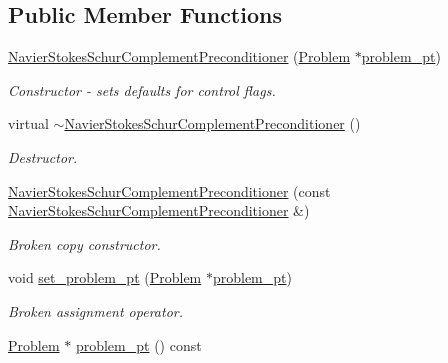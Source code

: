 \subsection*{Public Member Functions}
\begin{DoxyCompactItemize}
\item 
\hyperlink{classoomph_1_1NavierStokesSchurComplementPreconditioner_ac5ca2d9d665f4bd0a9f2e2cc103486b0}{Navier\+Stokes\+Schur\+Complement\+Preconditioner} (\hyperlink{classoomph_1_1Problem}{Problem} $\ast$\hyperlink{classoomph_1_1NavierStokesSchurComplementPreconditioner_afc57fedbcd960d99c5ab3f135eacb612}{problem\+\_\+pt})
\begin{DoxyCompactList}\small\item\em Constructor -\/ sets defaults for control flags. \end{DoxyCompactList}\item 
virtual \hyperlink{classoomph_1_1NavierStokesSchurComplementPreconditioner_ad954b4f67329c643d5219ed573805b81}{$\sim$\+Navier\+Stokes\+Schur\+Complement\+Preconditioner} ()
\begin{DoxyCompactList}\small\item\em Destructor. \end{DoxyCompactList}\item 
\hyperlink{classoomph_1_1NavierStokesSchurComplementPreconditioner_a3597811461decb5beec486bce3de36cd}{Navier\+Stokes\+Schur\+Complement\+Preconditioner} (const \hyperlink{classoomph_1_1NavierStokesSchurComplementPreconditioner}{Navier\+Stokes\+Schur\+Complement\+Preconditioner} \&)
\begin{DoxyCompactList}\small\item\em Broken copy constructor. \end{DoxyCompactList}\item 
void \hyperlink{classoomph_1_1NavierStokesSchurComplementPreconditioner_a41814f592afecb493310be513c595739}{set\+\_\+problem\+\_\+pt} (\hyperlink{classoomph_1_1Problem}{Problem} $\ast$\hyperlink{classoomph_1_1NavierStokesSchurComplementPreconditioner_afc57fedbcd960d99c5ab3f135eacb612}{problem\+\_\+pt})
\begin{DoxyCompactList}\small\item\em Broken assignment operator. \end{DoxyCompactList}\item 
\hyperlink{classoomph_1_1Problem}{Problem} $\ast$ \hyperlink{classoomph_1_1NavierStokesSchurComplementPreconditioner_afc57fedbcd960d99c5ab3f135eacb612}{problem\+\_\+pt} () const
\item 

\end{DoxyCompactItemize}
